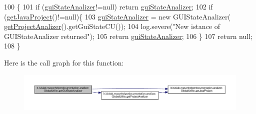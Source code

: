 \begin{DoxyCode}
100                                                         \{
101         \textcolor{keywordflow}{if} (\hyperlink{classit_1_1isislab_1_1masonhelperdocumentation_1_1analizer_1_1_global_utility_a0104f618583fd4e003dcc2b40ba5b8e8}{guiStateAnalizer}!=null) \textcolor{keywordflow}{return} \hyperlink{classit_1_1isislab_1_1masonhelperdocumentation_1_1analizer_1_1_global_utility_a0104f618583fd4e003dcc2b40ba5b8e8}{guiStateAnalizer};
102         \textcolor{keywordflow}{if} (\hyperlink{classit_1_1isislab_1_1masonhelperdocumentation_1_1analizer_1_1_global_utility_a1ce214dc72551ff78133933c461d4e59}{getJavaProject}()!=null)\{
103             \hyperlink{classit_1_1isislab_1_1masonhelperdocumentation_1_1analizer_1_1_global_utility_a0104f618583fd4e003dcc2b40ba5b8e8}{guiStateAnalizer} = \textcolor{keyword}{new} GUIStateAnalizer(
      \hyperlink{classit_1_1isislab_1_1masonhelperdocumentation_1_1analizer_1_1_global_utility_af6bcca0c06ec6fa8c2b2b88f5050914c}{getProjectAnalizer}().getGuiStateCU());        
104             log.severe(\textcolor{stringliteral}{"New istance of GUIStateAnalizer returned"});
105             \textcolor{keywordflow}{return} \hyperlink{classit_1_1isislab_1_1masonhelperdocumentation_1_1analizer_1_1_global_utility_a0104f618583fd4e003dcc2b40ba5b8e8}{guiStateAnalizer};
106         \}
107         \textcolor{keywordflow}{return} null;
108     \}
\end{DoxyCode}


Here is the call graph for this function\-:\nopagebreak
\begin{figure}[H]
\begin{center}
\leavevmode
\includegraphics[width=350pt]{classit_1_1isislab_1_1masonhelperdocumentation_1_1analizer_1_1_global_utility_afcb5ea1aa5461f297ee3683d8528e6b9_cgraph}
\end{center}
\end{figure}


